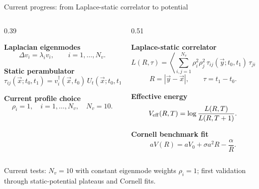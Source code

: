 \documentclass[11pt,rgb,ratio=169]{beamer}
\newcommand{\smallcite}[1]{{\scriptsize\textcolor{gray!80!black}{#1}}}
\begin{document}
\begin{frame}{Current progress: from Laplace-static correlator to potential}
\scriptsize

\begin{columns}[T,totalwidth=\textwidth]

\begin{column}{0.39\textwidth}

\textbf{Laplacian eigenmodes}\vspace{-0.2em}
\[
\Delta v_i = \lambda_i v_i,
\qquad i=1,\dots,N_v .
\]

\vspace{0.5em}
\textbf{Static perambulator}\vspace{-0.2em}
\[
 \tau_{ij}(\vec x;t_0,t_1)
 =
 v_i^\dagger(\vec x,t_0)\,
 U_t(\vec x;t_0,t_1)\,
 v_j(\vec x,t_1).
\]

\vspace{0.5em}
\textbf{Current profile choice}\vspace{-0.2em}
\[
\rho_i = 1,
\quad
i=1,\dots,N_v,
\quad
N_v=10 .
\]

\end{column}

\begin{column}{0.51\textwidth}

\textbf{Laplace-static correlator}\vspace{-0.2em}
\[
 L(R,\tau)
 =
 \left\langle
 \sum_{i,j=1}^{N_v}
 \rho_i^2\rho_j^2\,
 \tau_{ij}(\vec y;t_0,t_1)\,
 \tau_{ji}(\vec x;t_1,t_0)
 \right\rangle ,
\]
\[
R=|\vec y-\vec x|,
\qquad
\tau=t_1-t_0 .
\]

\vspace{0.35em}
\textbf{Effective energy}\vspace{-0.2em}
\[
 V_{\rm eff}(R,T)
 =
 \log\frac{L(R,T)}{L(R,T+1)} .
\]

\vspace{0.35em}
\textbf{Cornell benchmark fit}\vspace{-0.2em}
\[
 aV(R)
 =
 aV_0+\sigma a^2 R-\frac{\alpha}{R}.
\]

\end{column}

\end{columns}

\vspace{0.35em}
\smallcite{Current tests: $N_v=10$ with constant eigenmode weights $\rho_i=1$; first validation through static-potential plateaus and Cornell fits.}

\end{frame}
\end{document}

